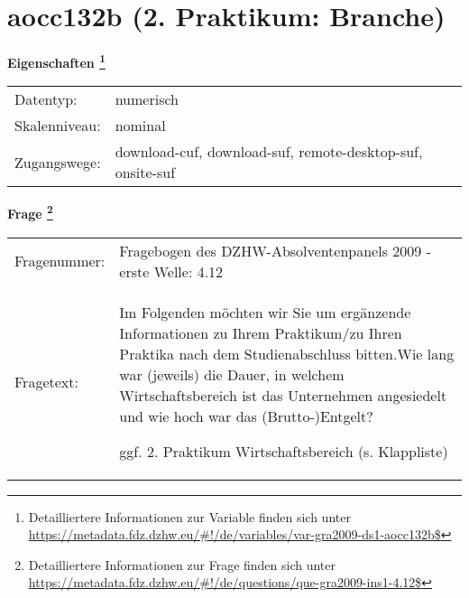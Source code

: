
    \setcounter{footnote}{0}

    \vspace*{-1.8cm}
	\section{aocc132b (2. Praktikum: Branche)}
	\label{section:aocc132b}



    \vspace*{0.5cm}
    \noindent\textbf{Eigenschaften
	\footnote{Detailliertere Informationen zur Variable finden sich unter
		\url{https://metadata.fdz.dzhw.eu/\#!/de/variables/var-gra2009-ds1-aocc132b$}}}\\
	\begin{tabularx}{\hsize}{@{}lX}
	Datentyp: & numerisch \\
	Skalenniveau: & nominal \\
	Zugangswege: &
	  download-cuf, 
	  download-suf, 
	  remote-desktop-suf, 
	  onsite-suf
 \\
    \end{tabularx}



				\vspace*{0.5cm}
                \noindent\textbf{Frage
	                \footnote{Detailliertere Informationen zur Frage finden sich unter
		              \url{https://metadata.fdz.dzhw.eu/\#!/de/questions/que-gra2009-ins1-4.12$}}}\\
				\begin{tabularx}{\hsize}{@{}lX}
					Fragenummer: &
					  Fragebogen des DZHW-Absolventenpanels 2009 - erste Welle:
					  4.12
 \\
					Fragetext: & Im Folgenden möchten wir Sie um ergänzende Informationen zu Ihrem Praktikum/zu Ihren Praktika nach dem Studienabschluss bitten.Wie lang war (jeweils) die Dauer, in welchem Wirtschaftsbereich ist das Unternehmen angesiedelt und wie hoch war das (Brutto-)Entgelt?\par  ggf. 2. Praktikum Wirtschaftsbereich (s. Klappliste) \\
				\end{tabularx}





